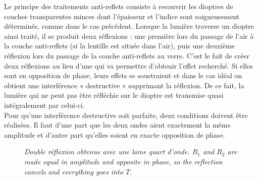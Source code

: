 Le principe des traitements anti-reflets consiste à recouvrir les dioptres de
couches transparentes minces dont l'épaisseur et l'indice sont soigneusement
déterminés, comme dans le cas précédent. Lorsque la lumière traverse un dioptre
ainsi traité, il se produit deux réflexions : une première lors du passage de
l'air à la couche anti-reflets (si la lentille est située dans l'air), puis une
deuxième réflexion lors du passage de la couche anti-reflets au verre. C'est le
fait de créer deux réflexions au lieu d'une qui va permettre d'obtenir l'effet
recherché. Si elles sont en opposition de phase, leurs effets se soustraient et
dans le cas idéal on obtient une interférence « destructive » supprimant la
réflexion. De ce fait, la lumière qui ne peut pas être réfléchie sur le dioptre
est transmise quasi intégralement par celui-ci.\\

Pour qu'une interférence destructive soit parfaite, deux conditions doivent être
réalisées. Il faut d'une part que les deux ondes aient exactement la même
amplitude et d'autre part qu'elles soient en exacte opposition de phase.

\begin{figure}[h!]
  \centering

  \smallskip
  {\small\itshape Double réflexion obtenue avec une lame quart d'onde. $R_1$ and
  $R_2$ are made equal in amplitude and
  opposite in phase, so the reflection cancels and everything goes into $T$.}
\end{figure}

